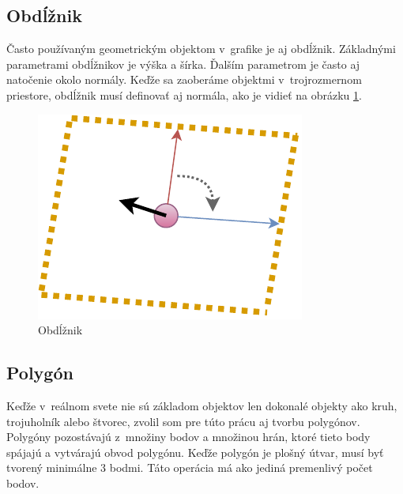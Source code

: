 \subsection*{Obdĺžnik}
Často používaným geometrickým objektom v~grafike je aj obdĺžnik. Základnými parametrami obdĺžnikov je výška a šírka. Ďalším parametrom je často aj natočenie okolo normály. Keďže sa zaoberáme objektmi v~trojrozmernom priestore, obdĺžnik musí definovať aj normála, ako je vidieť na obrázku \ref{fig:SurfaceCreate Rectangle}. 


\begin{figure}[H]
	\centering

	\includegraphics[height=0.3\textwidth]{obrazky-figures/Diagram/Draw/3Plane/DP Navrh operacii-2D - SurfaceCreate Rectangle.pdf}
	\caption{Obdĺžnik}
	\label{fig:SurfaceCreate Rectangle}
\end{figure}



\subsection*{Polygón}
Keďže v~reálnom svete nie sú základom objektov len dokonalé objekty ako kruh, trojuholník alebo štvorec, zvolil som pre túto prácu aj tvorbu polygónov. Polygóny pozostávajú z~množiny bodov a množinou hrán, ktoré tieto body spájajú a vytvárajú obvod polygónu. Keďže polygón je plošný útvar, musí byť tvorený minimálne 3 bodmi. Táto operácia má ako jediná premenlivý počet bodov. 

